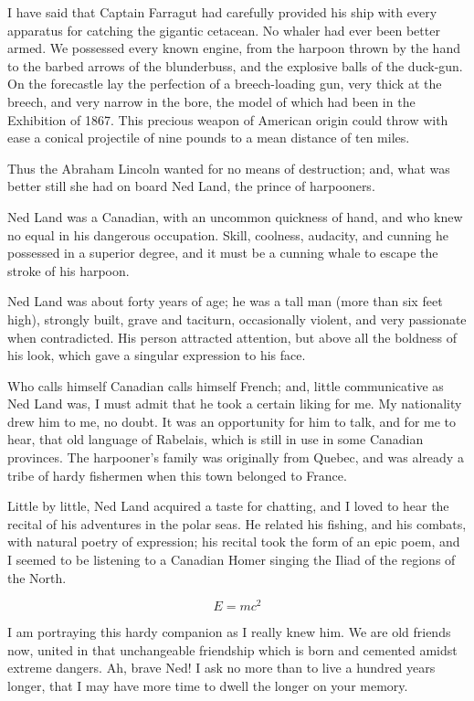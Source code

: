 I have said that Captain Farragut had carefully provided his
ship with every apparatus for catching the gigantic cetacean.
No whaler had ever been better armed.  We possessed every
known engine, from the harpoon thrown by the hand to the barbed
arrows of the blunderbuss, and the explosive balls of the duck-gun.
On the forecastle lay the perfection of a breech-loading gun,
very thick at the breech, and very narrow in the bore,
the model of which had been in the Exhibition of 1867.
This precious weapon of American origin could throw with ease
a conical projectile of nine pounds to a mean distance
of ten miles.

Thus the Abraham Lincoln wanted for no means of destruction; and, what was
better still she had on board Ned Land, the prince of harpooners.

Ned Land was a Canadian, with an uncommon quickness of hand, and who knew
no equal in his dangerous occupation.  Skill, coolness, audacity, and cunning
he possessed in a superior degree, and it must be a cunning whale to escape
the stroke of his harpoon.

Ned Land was about forty years of age; he was a tall man
(more than six feet high), strongly built, grave and taciturn,
occasionally violent, and very passionate when contradicted.
His person attracted attention, but above all the boldness
of his look, which gave a singular expression to his face.

Who calls himself Canadian calls himself French; and, little communicative
as Ned Land was, I must admit that he took a certain liking for me.
My nationality drew him to me, no doubt.  It was an opportunity for him
to talk, and for me to hear, that old language of Rabelais, which is still
in use in some Canadian provinces.  The harpooner's family was originally
from Quebec, and was already a tribe of hardy fishermen when this town
belonged to France.

Little by little, Ned Land acquired a taste for chatting, and I
loved to hear the recital of his adventures in the polar seas.
He related his fishing, and his combats, with natural poetry
of expression; his recital took the form of an epic poem,
and I seemed to be listening to a Canadian Homer singing the Iliad
of the regions of the North.

\begin{equation}
E=mc^2
\end{equation}

I am portraying this hardy companion as I really knew him.
We are old friends now, united in that unchangeable friendship
which is born and cemented amidst extreme dangers.  Ah, brave Ned!
I ask no more than to live a hundred years longer, that I may have more
time to dwell the longer on your memory.

